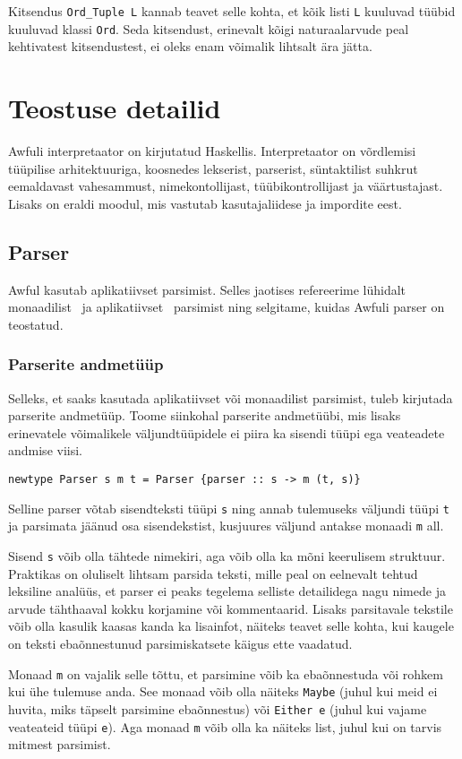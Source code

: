 \documentclass[12pt]{article}
\newcommand\peatykk[1]{
  \clearpage
  \section{#1}}
\begin{document}
      Kitsendus \verb!Ord_Tuple L! kannab teavet selle kohta, et kõik listi \verb!L! kuuluvad tüübid kuuluvad klassi \verb!Ord!. Seda kitsendust, erinevalt kõigi naturaalarvude peal kehtivatest kitsendustest, ei oleks enam võimalik lihtsalt ära jätta.
  \peatykk{Teostuse detailid}
    Awfuli interpretaator on kirjutatud Haskellis. Interpretaator on võrdlemisi tüüpilise arhitektuuriga, koosnedes lekserist, parserist, süntaktilist suhkrut eemaldavast vahesammust, nimekontollijast, tüübikontrollijast ja väärtustajast. Lisaks on eraldi moodul, mis vastutab kasutajaliidese ja impordite eest.
    \subsection{Parser}
      Awful kasutab aplikatiivset parsimist. Selles jaotises refereerime lühidalt monaadilist~\cite{Mon} ja aplikatiivset~\cite{App} parsimist ning selgitame, kuidas Awfuli parser on teostatud.
      \subsubsection{Parserite andmetüüp}\label{parserityyp}
        Selleks, et saaks kasutada aplikatiivset või monaadilist parsimist, tuleb kirjutada parserite andmetüüp. Toome siinkohal parserite andmetüübi, mis lisaks erinevatele võimalikele väljundtüüpidele ei piira ka sisendi tüüpi ega veateadete andmise viisi.

        \begin{verbatim}newtype Parser s m t = Parser {parser :: s -> m (t, s)}\end{verbatim}

        Selline parser võtab sisendteksti tüüpi \verb!s! ning annab tulemuseks väljundi tüüpi \verb!t! ja parsimata jäänud osa sisendekstist, kusjuures väljund antakse monaadi \verb!m! all.

        Sisend \verb!s! võib olla tähtede nimekiri, aga võib olla ka mõni keerulisem struktuur. Praktikas on oluliselt lihtsam parsida teksti, mille peal on eelnevalt tehtud leksiline analüüs, et parser ei peaks tegelema selliste detailidega nagu nimede ja arvude tähthaaval kokku korjamine või kommentaarid. Lisaks parsitavale tekstile võib olla kasulik kaasas kanda ka lisainfot, näiteks teavet selle kohta, kui kaugele on teksti ebaõnnestunud parsimiskatsete käigus ette vaadatud.

        Monaad \verb!m! on vajalik selle tõttu, et parsimine võib ka ebaõnnestuda või rohkem kui ühe tulemuse anda. See monaad võib olla näiteks \verb!Maybe! (juhul kui meid ei huvita, miks täpselt parsimine ebaõnnestus) või \verb!Either e! (juhul kui vajame veateateid tüüpi \verb!e!). Aga monaad \verb!m! võib olla ka näiteks list, juhul kui on tarvis mitmest parsimist.
\end{document}
